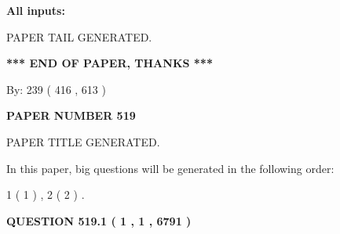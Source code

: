 \documentclass[12pt]{article}
\begin{document}
   
   
   
\noindent{}
   
   
   
   
\noindent\vspace{0.1in}\hspace{-0.08in} {\textbf{\Large{All inputs: }}}
   
   
   
   
   
   
 \vspace{0.2in}
 
   
   
\vspace{2.0in} PAPER TAIL GENERATED.
   
   
   
   
\vspace{1.0in} 
{\textbf{\large{ *** END OF PAPER, THANKS *** }}} 
   
   
\hspace{1.0in} By: 
 239 ( 416 ,  613 )
   
   
   
   
\newpage 
\setcounter{page}{ 
   519001 } 
   
   
   
   
 {\textbf{ \Large{ PAPER NUMBER  519  }}}
   
   
\vspace{0.2in}
   
   
   
   
   
   
   
   
 \vspace{0.2in}
 
 
 
 
   
   
 PAPER TITLE GENERATED.
   
   
   
\vspace{0.2in}
   
In this paper, big questions will be generated in the following order: 
   
   
   1 ( 1 )
 ,
   2 ( 2 )
 .
  
\vspace{0.2in}
  
{\textbf{\Large{QUESTION
519.1 
 ( 1 , 1 , 6791 )
}}}
  
\end{document}
